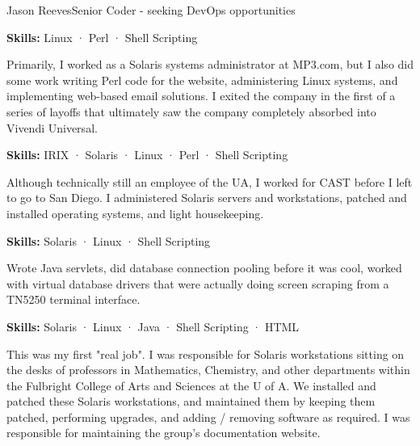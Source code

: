 \documentclass{article}
\begin{document}
\begin{cv}[avatar]{Jason Reeves}{Senior Coder - seeking DevOps opportunities}
\begin{cvevent}[Mar 2000][May 2000]
  \textbf{Skills:} Linux · Perl · Shell Scripting
  \vspace*{5mm}
\end{cvevent}

\begin{cvevent}[Nov 1999][Mar 2000]
  Primarily, I worked as a Solaris systems administrator at MP3.com, but I also did some work writing Perl code for the website, administering Linux systems, and implementing web-based email solutions. I exited the company in the first of a series of layoffs that ultimately saw the company completely absorbed into Vivendi Universal.
  \vspace*{3mm}
  
  \textbf{Skills:} IRIX · Solaris · Linux · Perl · Shell Scripting
  \vspace*{5mm}
\end{cvevent}

\begin{cvevent}[Jan 1998][Nov 1999]
  Although technically still an employee of the UA, I worked for CAST before I left to go to San Diego. I administered Solaris servers and workstations, patched and installed operating systems, and light housekeeping.
  \vspace*{3mm}
  
  \textbf{Skills:} Solaris · Linux · Shell Scripting
  \vspace*{5mm}
\end{cvevent}

\begin{cvevent}[Jan 1997][Nov 1998]
  Wrote Java servlets, did database connection pooling before it was cool, worked with virtual database drivers that were actually doing screen scraping from a TN5250 terminal interface.
  \vspace*{3mm}
  
  \textbf{Skills:} Solaris · Linux · Java · Shell Scripting · HTML
  \vspace*{5mm}
\end{cvevent}

\begin{cvevent}[Nov 1995][Jan 1997]
  This was my first "real job". I was responsible for Solaris workstations sitting on the desks of professors in Mathematics, Chemistry, and other departments within the Fulbright College of Arts and Sciences at the U of A. We installed and patched these Solaris workstations, and maintained them by keeping them patched, performing upgrades, and adding / removing software as required. I was responsible for maintaining the group's documentation website.
  \vspace*{3mm}
  

\end{cvevent}
\end{cv}
\end{document}
